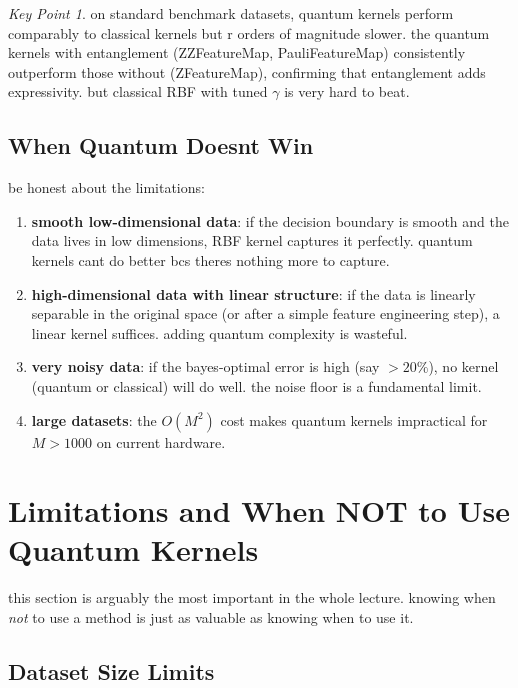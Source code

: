 \documentclass[11pt,a4paper]{article}
\theoremstyle{definition}
\theoremstyle{remark}
\newtheorem*{keypoint}{Key Point}
\begin{document}
\begin{keypoint}
on standard benchmark datasets, quantum kernels perform comparably to classical kernels but r orders of magnitude slower. the quantum kernels with entanglement (ZZFeatureMap, PauliFeatureMap) consistently outperform those without (ZFeatureMap), confirming that entanglement adds expressivity. but classical RBF with tuned $\gamma$ is very hard to beat.
\end{keypoint}

\subsection{When Quantum Doesnt Win}

be honest about the limitations:

\begin{enumerate}[leftmargin=*]
    \item \textbf{smooth low-dimensional data}: if the decision boundary is smooth and the data lives in low dimensions, RBF kernel captures it perfectly. quantum kernels cant do better bcs theres nothing more to capture.

    \item \textbf{high-dimensional data with linear structure}: if the data is linearly separable in the original space (or after a simple feature engineering step), a linear kernel suffices. adding quantum complexity is wasteful.

    \item \textbf{very noisy data}: if the bayes-optimal error is high (say $> 20\%$), no kernel (quantum or classical) will do well. the noise floor is a fundamental limit.

    \item \textbf{large datasets}: the $O(M^2)$ cost makes quantum kernels impractical for $M > 1000$ on current hardware.
\end{enumerate}

\section{Limitations and When NOT to Use Quantum Kernels}

this section is arguably the most important in the whole lecture. knowing when \emph{not} to use a method is just as valuable as knowing when to use it.

\subsection{Dataset Size Limits}
\end{document}
